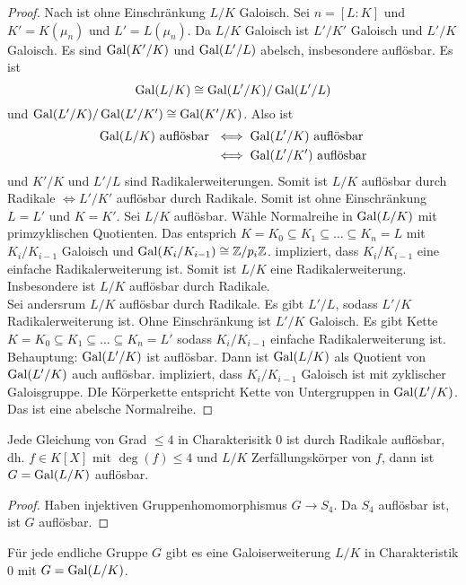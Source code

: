 \begin{proof}
	Nach  ist ohne Einschränkung \(L/K\) Galoisch.
	Sei \(n=[L:K]\) und \(K'=K(\mu_n)\) und \(L'=L(\mu_n)\).
	Da \(L/K\) Galoisch ist \(L'/K'\) Galoisch und \(L'/K\) Galoisch. Es sind \(\operatorname{Gal}(K'/K)\) und \(\operatorname{Gal}(L'/L)\) abelsch, insbesondere auflösbar.
	Es ist \[\operatorname{Gal}(L/K)\cong \operatorname{Gal}(L'/K)/\operatorname{Gal}(L'/L)\] und \(\operatorname{Gal}(L'/K)/\operatorname{Gal}(L'/K')\cong \operatorname{Gal}(K'/K)\).
	Also ist \begin{align*}
		\operatorname{Gal}(L/K)\text{ auflösbar }&\iff \operatorname{Gal}(L'/K) \text{ auflösbar}\\
		&\iff \operatorname{Gal}(L'/K') \text{ auflösbar}
	\end{align*}
	und \(K'/K\) und \(L'/L\) sind Radikalerweiterungen. Somit ist \(L/K\) auflösbar durch Radikale \(\iff L'/K'\) auflösbar durch Radikale. Somit ist ohne Einschränkung \(L=L'\) und \(K=K'\).
	Sei \(L/K\) auflösbar. Wähle Normalreihe in \(\operatorname{Gal}(L/K)\) mit primzyklischen Quotienten. Das entsprich \(K=K_0\subseteq K_1\subseteq\dots\subseteq K_n=L\) mit \(K_i/K_{i-1}\) Galoisch und \(\operatorname{Gal}(K_i/K_{i-1})\cong \mathbb{Z}/p_i\mathbb{Z}\).   impliziert, dass \(K_i/K_{i-1}\) eine einfache Radikalerweiterung ist. Somit ist \(L/K\) eine Radikalerweiterung. Insbesondere ist \(L/K\) auflösbar durch Radikale.\\
	Sei andersrum \(L/K\) auflösbar durch Radikale. Es gibt \(L'/L\), sodass \(L'/K\) Radikalerweiterung ist. Ohne Einschränkung ist \(L'/K\) Galoisch. Es gibt Kette \(K=K_0\subseteq K_1\subseteq\dots\subseteq K_n=L'\) sodass \(K_i/K_{i-1}\) einfache Radikalerweiterung ist.
	Behauptung: \(\operatorname{Gal}(L'/K)\) ist auflösbar. Dann ist \(\operatorname{Gal}(L/K)\) als Quotient von \(\operatorname{Gal}(L'/K)\) auch auflösbar.
	 impliziert, dass \(K_i/K_{i-1}\) Galoisch ist mit zyklischer Galoisgruppe. DIe Körperkette entspricht Kette von Untergruppen in \(\operatorname{Gal}(L'/K)\). Das ist eine abelsche Normalreihe.
\end{proof}
\begin{Kor}
	Jede Gleichung von Grad \(\leq 4\) in Charakterisitk \(0\) ist durch Radikale auflösbar, dh. \(f\in K[X]\) mit \(\deg(f)\leq 4\) und \(L/K\) Zerfällungskörper von \(f\), dann ist \(G=\operatorname{Gal}(L/K)\) auflösbar.
\end{Kor}
\begin{proof}
	Haben injektiven Gruppenhomomorphismus \(G\to S_4\). Da \(S_4\) auflösbar ist, ist \(G\) auflösbar.
\end{proof}
\begin{Satz}
	Für jede endliche Gruppe \(G\) gibt es eine Galoiserweiterung \(L/K\) in Charakteristik \(0\) mit \(G=\operatorname{Gal}(L/K)\).
\end{Satz}

